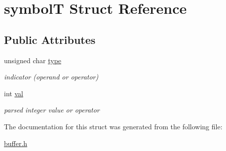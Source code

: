 \hypertarget{structsymbolT}{}\section{symbolT Struct Reference}
\label{structsymbolT}
\subsection*{Public Attributes}
\begin{DoxyCompactItemize}
\item 
\mbox{\label{structsymbolT_a82e3326d83d566391f5f07531b596a56}} 
unsigned char \hyperlink{structsymbolT_a82e3326d83d566391f5f07531b596a56}{type}
\begin{DoxyCompactList}\small\item\em indicator (operand or operator) \end{DoxyCompactList}\item 
\mbox{\label{structsymbolT_a8bcd4f48b8906ca6bf79d5dc4b2814b7}} 
int \hyperlink{structsymbolT_a8bcd4f48b8906ca6bf79d5dc4b2814b7}{val}
\begin{DoxyCompactList}\small\item\em parsed integer value or operator \end{DoxyCompactList}\end{DoxyCompactItemize}


The documentation for this struct was generated from the following file\+:\begin{DoxyCompactItemize}
\item 
\hyperlink{buffer_8h}{buffer.\+h}\end{DoxyCompactItemize}
